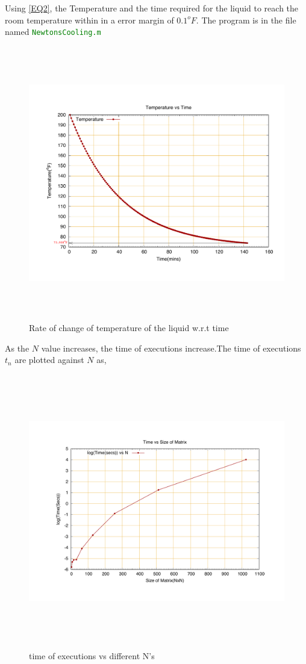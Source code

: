 \documentclass[fleqn,letterpaper,12pt]{report}
\begin{document}
Using \eqref{EQ2}, the Temperature and the time required for the liquid to reach the room temperature within in a error margin of $0.1^oF$. The program is in the file named {\tt{\textcolor{Green}{NewtonsCooling.m}}}
\begin{figure}[ht!]
	\centering
	\includegraphics[height=120mm,width=160mm]{T.pdf}
	\caption{Rate of change of temperature of the liquid w.r.t time\label{overflow}}
\end{figure}

\newpage
{}
{}
\problem

As the $N$ value increases, the time of executions increase.The time of executions $t_n$ are plotted against $N$ as,

\begin{figure}[ht!]
	\centering
	\includegraphics[height=120mm,width=160mm]{matrix_multiply.pdf}
	\caption{time of executions vs different N's\label{overflow}}
\end{figure}
\end{document}
